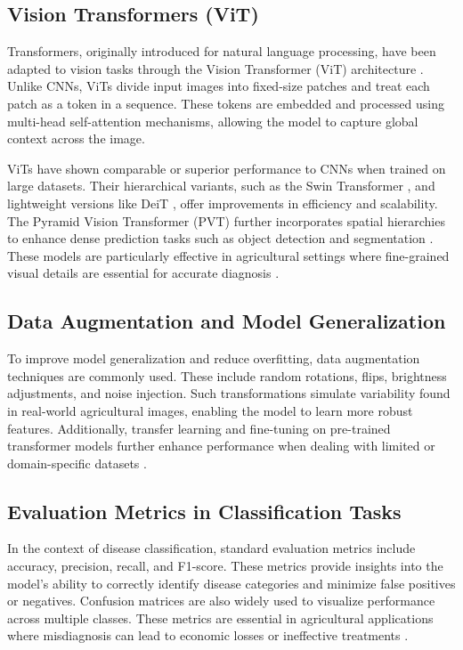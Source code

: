 \documentclass[preprint,12pt]{elsarticle}
\begin{document}
\subsection{Vision Transformers (ViT)}

Transformers, originally introduced for natural language processing, have been adapted to vision tasks through the Vision Transformer (ViT) architecture \cite{Dosovitskiy2020AnII}. Unlike CNNs, ViTs divide input images into fixed-size patches and treat each patch as a token in a sequence. These tokens are embedded and processed using multi-head self-attention mechanisms, allowing the model to capture global context across the image.

ViTs have shown comparable or superior performance to CNNs when trained on large datasets. Their hierarchical variants, such as the Swin Transformer \cite{Liu2021SwinTH}, and lightweight versions like DeiT \cite{Touvron2021TrainingDI}, offer improvements in efficiency and scalability. The Pyramid Vision Transformer (PVT) further incorporates spatial hierarchies to enhance dense prediction tasks such as object detection and segmentation \cite{Wang2021PyramidVT}. These models are particularly effective in agricultural settings where fine-grained visual details are essential for accurate diagnosis \cite{Li2023GrapeViT,Gao2022WheatRust}.

\subsection{Data Augmentation and Model Generalization}

To improve model generalization and reduce overfitting, data augmentation techniques are commonly used. These include random rotations, flips, brightness adjustments, and noise injection. Such transformations simulate variability found in real-world agricultural images, enabling the model to learn more robust features. Additionally, transfer learning and fine-tuning on pre-trained transformer models further enhance performance when dealing with limited or domain-specific datasets \cite{Touvron2021TrainingDI}.

\subsection{Evaluation Metrics in Classification Tasks}

In the context of disease classification, standard evaluation metrics include accuracy, precision, recall, and F1-score. These metrics provide insights into the model’s ability to correctly identify disease categories and minimize false positives or negatives. Confusion matrices are also widely used to visualize performance across multiple classes. These metrics are essential in agricultural applications where misdiagnosis can lead to economic losses or ineffective treatments \cite{Ferentinos2018DeepLA}.
\end{document}

